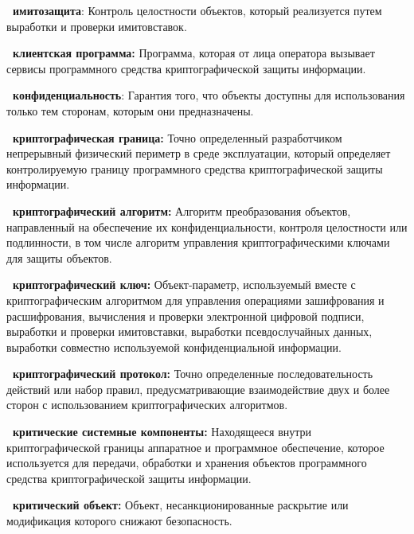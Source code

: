 {\bf \thedefctr~имитозащита}:
Контроль целостности объектов, 
который реализуется путем выработки и проверки имитовставок.



{\bf \thedefctr~клиентская программа:}
Программа, которая от лица оператора вызывает сервисы
программного средства криптографической защиты информации.

{\bf \thedefctr~конфиденциальность}:
Гарантия того, что объекты доступны для использования
только тем сторонам, которым они предназначены.

{\bf \thedefctr~криптографическая граница:} 
Точно определенный разработчиком непрерывный физический 
периметр в среде эксплуатации, 
который определяет контролируемую границу программного средства 
криптографической защиты информации.

{\bf \thedefctr~криптографический алгоритм:}
Алгоритм преобразования объектов,
направленный на обеспечение их конфиденциальности,
контроля целостности или подлинности,
в том числе алгоритм управления криптографическими
ключами для защиты объектов.

{\bf \thedefctr~криптографический ключ:} 
Объект-параметр, используемый вместе с криптографическим алгоритмом 
для управления операциями зашифрования и расшифрования,
вычисления и проверки электронной цифровой подписи,
выработки и проверки имитовставки,
выработки псевдослучайных данных,
выработки совместно используемой конфиденциальной информации.


{\bf \thedefctr~криптографический протокол:}
Точно определенные последовательность действий или набор правил, 
предусматривающие взаимодействие двух и более сторон 
с использованием криптографических алгоритмов.

{\bf \thedefctr~критические системные компоненты:}
Находящееся внутри криптографической границы 
аппаратное и программное обеспечение, которое используется
для передачи, обработки и хранения объектов
программного средства криптографической защиты информации.

{\bf \thedefctr~критический объект:} 
Объект, несанкционированные раскрытие или модификация которого 
снижают безопасность.

